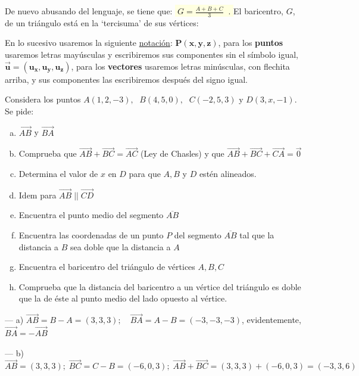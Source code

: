 De nuevo abusando del lenguaje, se tiene que: \colorbox{LightYellow}{$\boxed{\;G=\frac{A+B+C}{3}\;}\; .$\; }
El baricentro, $G$,  de un triángulo está en la `tercisuma' de sus vértices:



\vspace{3mm}En lo sucesivo usaremos la siguiente \underline{notación}: $\boldsymbol{ P(x,y,z)}$, para los \textbf{puntos} usaremos letras mayúsculas y escribiremos sus componentes sin el símbolo igual, $\boldsymbol{\vec u=(u_x,u_y,u_z)}$, para los  \textbf{vectores} usaremos letras minúsculas, con flechita arriba, y sus componentes las escribiremos después del signo igual.

\begin{ejem}
\small{Considera} los puntos $A(1,2,-3),$ $\; B(4,5,0),$ $\; C(-2,5,3)$ y $D(3,x,-1)$. Se pide:
\begin{enumerate}[a) ]	
\item $\overrightarrow {AB}$ y  $\overrightarrow {BA}$
\item Comprueba que $\overrightarrow {AB}+\overrightarrow {BC}=\overrightarrow{AC}$ 
\textcolor{gris}{(Ley de Chasles)} y que 
$\overrightarrow {AB}+\overrightarrow {BC}+\overrightarrow {CA}=\overrightarrow {0}$
\item Determina el valor de $x$ en $D$ para que $A,B$ y $D$ estén alineados.
\item Idem para  $\overrightarrow {AB}\;||\;\overrightarrow {CD}$	
\item Encuentra el punto medio del segmento  $\overline {AB}$
\item Encuentra las coordenadas de un punto $P$ del segmento  $\overline {AB}$ tal que la distancia a $B$ sea doble que la distancia a $A$
\item Encuentra el baricentro del triángulo de vértices $A,B,C$
\item Comprueba que la distancia del baricentro a un vértice del triángulo es doble que la de éste al punto medio del lado opuesto al vértice.
\end{enumerate}

\small{\noindent --- a) $\overrightarrow {AB}=B-A=(3,3,3);\quad \overrightarrow {BA}=A-B=(-3,-3,-3)$, evidentemente, $\overrightarrow {BA}=-\overrightarrow {AB}$}

\noindent --- b) $\overrightarrow {AB}=(3,3,3); \; \overrightarrow {BC}=C-B=(-6,0,3); \; \overrightarrow {AB}+\overrightarrow {BC}=(3,3,3)+(-6,0,3)=(-3,3,6)$


\end{ejem}
